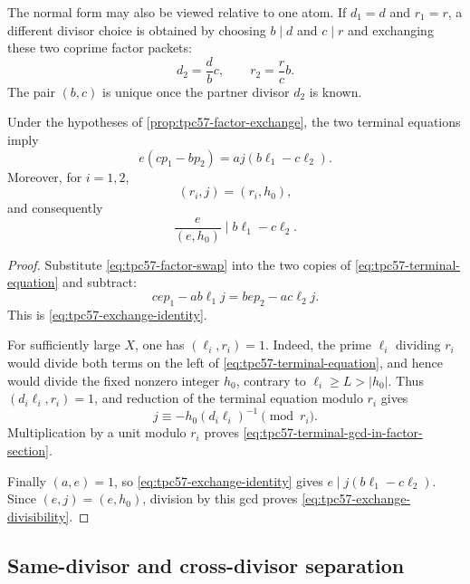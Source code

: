 The normal form may also be viewed relative to one atom.  If
\(d_1=d\) and \(r_1=r\), a different divisor choice is obtained by
choosing \(b\mid d\) and \(c\mid r\) and exchanging these two coprime
factor packets:
\begin{equation}
 d_2=\frac d b c,
 \qquad
 r_2=\frac r c b.
 \label{eq:tpc57-relative-factor-swap}
\end{equation}
The pair \((b,c)\) is unique once the partner divisor \(d_2\) is known.

\begin{proposition}
\label{prop:tpc57-exchange-identity}
Under the hypotheses of
\cref{prop:tpc57-factor-exchange}, the two terminal equations imply
\begin{equation}
 \boxed{
 e(cp_1-bp_2)=aj(b\ell_1-c\ell_2).}
 \label{eq:tpc57-exchange-identity}
\end{equation}
Moreover, for \(i=1,2\),
\begin{equation}
 (r_i,j)=(r_i,h_0),
 \label{eq:tpc57-terminal-gcd-in-factor-section}
\end{equation}
and consequently
\begin{equation}
 \boxed{
 \frac{e}{(e,h_0)}\mid b\ell_1-c\ell_2.}
 \label{eq:tpc57-exchange-divisibility}
\end{equation}
\end{proposition}

\begin{proof}
Substitute \eqref{eq:tpc57-factor-swap} into the two copies of
\eqref{eq:tpc57-terminal-equation} and subtract:
\[
 cep_1-ab\ell_1j= bep_2-ac\ell_2j.
\]
This is \eqref{eq:tpc57-exchange-identity}.

For sufficiently large \(X\), one has \((\ell_i,r_i)=1\).  Indeed,
the prime \(\ell_i\) dividing \(r_i\) would divide both terms on the
left of \eqref{eq:tpc57-terminal-equation}, and hence would divide the
fixed nonzero integer \(h_0\), contrary to \(\ell_i\ge L>|h_0|\).
Thus \((d_i\ell_i,r_i)=1\), and reduction of the terminal equation
modulo \(r_i\) gives
\[
 j\equiv-h_0(d_i\ell_i)^{-1}\pmod {r_i}.
\]
Multiplication by a unit modulo \(r_i\) proves
\eqref{eq:tpc57-terminal-gcd-in-factor-section}.

Finally \((a,e)=1\), so \eqref{eq:tpc57-exchange-identity} gives
\(e\mid j(b\ell_1-c\ell_2)\).  Since
\((e,j)=(e,h_0)\), division by this gcd proves
\eqref{eq:tpc57-exchange-divisibility}.
\end{proof}

\subsection{Same-divisor and cross-divisor separation}

